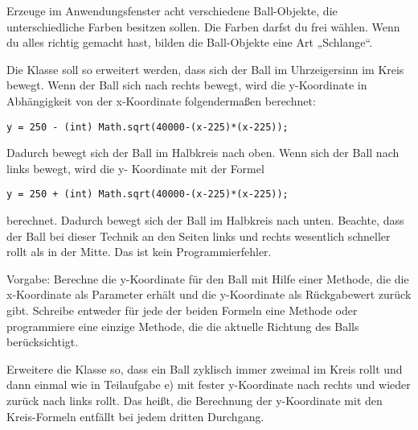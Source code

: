 \begin{compactenum}[a)]
Erzeuge im Anwendungsfenster acht verschiedene Ball-Objekte, die
unterschiedliche Farben besitzen sollen. Die Farben darfst du frei wählen. Wenn
du alles richtig gemacht hast, bilden die Ball-Objekte eine Art „Schlange“.

\item Die Klasse  soll so erweitert werden, dass sich der Ball im
Uhrzeigersinn im Kreis bewegt. Wenn der Ball sich nach rechts bewegt, wird die
y-Koordinate in Abhängigkeit von der x-Koordinate folgendermaßen berechnet:

\begin{lstlisting}
y = 250 - (int) Math.sqrt(40000-(x-225)*(x-225));
\end{lstlisting}

Dadurch bewegt sich der Ball im Halbkreis nach oben. Wenn sich der Ball nach
links bewegt, wird die y- Koordinate mit der Formel

\begin{lstlisting}
y = 250 + (int) Math.sqrt(40000-(x-225)*(x-225));
\end{lstlisting}

berechnet. Dadurch bewegt sich der Ball im Halbkreis nach unten. Beachte, dass
der Ball bei dieser Technik an den Seiten links und rechts wesentlich schneller
rollt als in der Mitte. Das ist kein Programmierfehler.

Vorgabe: Berechne die y-Koordinate für den Ball mit Hilfe einer Methode, die
die x-Koordinate als Parameter erhält und die y-Koordinate als Rückgabewert
zurück gibt. Schreibe entweder für jede der beiden Formeln eine Methode oder
programmiere eine einzige Methode, die die aktuelle Richtung des Balls
berücksichtigt.

\item Erweitere die Klasse  so, dass ein Ball zyklisch immer
zweimal im Kreis rollt und dann einmal wie in Teilaufgabe e) mit fester
y-Koordinate nach rechts und wieder zurück nach links rollt. Das heißt, die
Berechnung der y-Koordinate mit den Kreis-Formeln entfällt bei jedem dritten
Durchgang.

\end{compactenum}